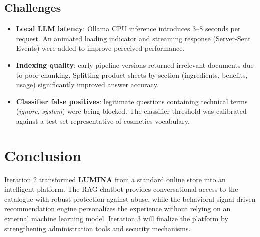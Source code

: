 \subsection{Challenges}

\begin{itemize}
  \item \textbf{Local LLM latency}: Ollama CPU inference introduces 3--8 seconds
        per request. An animated loading indicator and streaming response
        (Server-Sent Events) were added to improve perceived performance.
  \item \textbf{Indexing quality}: early pipeline versions returned irrelevant
        documents due to poor chunking. Splitting product sheets by section
        (ingredients, benefits, usage) significantly improved answer accuracy.
  \item \textbf{Classifier false positives}: legitimate questions containing
        technical terms (\textit{ignore}, \textit{system}) were being blocked.
        The classifier threshold was calibrated against a test set representative
        of cosmetics vocabulary.
\end{itemize}

\section*{Conclusion}
Iteration 2 transformed \textbf{LUMINA} from a standard online store into an
intelligent platform.
The RAG chatbot provides conversational access to the catalogue with robust
protection against abuse, while the behavioral signal-driven recommendation
engine personalizes the experience without relying on an external machine
learning model.
Iteration 3 will finalize the platform by strengthening administration tools
and security mechanisms.
